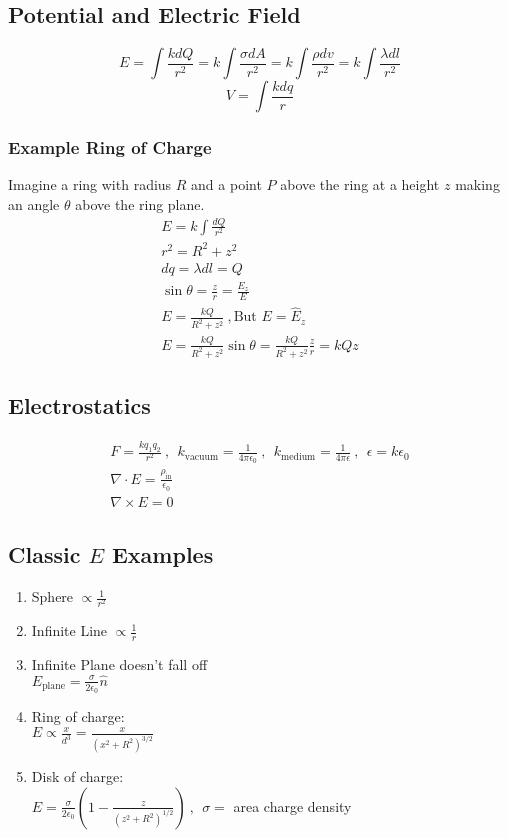 \documentclass[10pt,letter]{article}
\begin{document}
\subsection{Potential and Electric Field}
\begin{equation}
 E = \int \frac{kdQ}{r^2} = k\int\frac{\sigma dA}{r^2} = k\int \frac{\rho dv}{r^2} = k\int \frac{\lambda dl}{r^2}
\end{equation}
\begin{equation}
 V = \int \frac{kdq}{r}
\end{equation}

\subsubsection{Example Ring of Charge}
Imagine a ring with radius $R$ and a point $P$ above the ring at a height $z$ making an angle $\theta$ above the ring plane.
\begin{align}
 E = k\int \frac{dQ}{r^2}\\
 r^2 = R^2 + z^2\\
 dq = \lambda dl = Q\\
 \sin \theta = \frac{z}{r} = \frac{E_z}{E}\\
 E = \frac{kQ}{R^2 + z^2}~,\textrm{But }E = \hat{E}_z\\
 E = \frac{kQ}{R^2 + z^2}\sin\theta = \frac{kQ}{R^2 + z^2}\frac{z}{r} = kQz
\end{align}

\subsection{Electrostatics}
\begin{align}
 F = \frac{kq_1q_2}{r^2} ~,~~k_{\textrm{vacuum}}=\frac{1}{4\pi\epsilon_0}~,~~k_{\textrm{medium}}=\frac{1}{4\pi\epsilon}~,~~\epsilon = k \epsilon_0\\
 \nabla \cdot E = \frac{\rho_{\textrm{in}}}{\epsilon_0}\\
 \nabla \times E = 0
\end{align}

\subsection{Classic $E$ Examples}
\begin{enumerate}
    \item  Sphere $\propto \frac{1}{r^2}$
    \item Infinite Line $\propto \frac{1}{r}$
    \item Infinite Plane doesn't fall off\\
        $E_{\textrm{plane}} = \frac{\sigma}{2 \epsilon_0} \hat{n}$
    \item Ring of charge:\\
    $E \propto \frac{x}{d^3} = \frac{x}{(x^2 + R^2)^{3/2}}$
    \item Disk of charge:\\
    $E = \frac{\sigma}{2\epsilon_0} \left( 1 - \frac{z}{(z^2 + R^2)^{1/2}} \right) ~,~~\sigma =$ area charge density
\end{enumerate}
\end{document}
